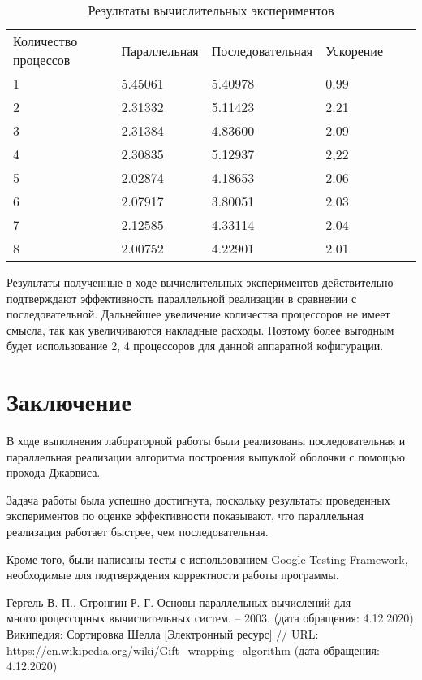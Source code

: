 \documentclass{report}
\begin{document}
\begin{table}[!h]
\caption{Результаты вычислительных экспериментов}
\centering
\begin{tabular}{llllll}
Количество процессов & Параллельная & Последовательная & Ускорение  \\
1        & 5.45061        & 5.40978      & 0.99                     \\
2        & 2.31332        & 5.11423      & 2.21                     \\
3        & 2.31384        & 4.83600      & 2.09                     \\
4        & 2.30835        & 5.12937      & 2,22                     \\
5        & 2.02874        & 4.18653      & 2.06                     \\
6        & 2.07917        & 3.80051      & 2.03                     \\
7        & 2.12585        & 4.33114      & 2.04                     \\
8        & 2.00752        & 4.22901      & 2.01      
\end{tabular}
\end{table}

\par Результаты полученные в ходе вычислительных экспериментов действительно подтверждают эффективность параллельной реализации в сравнении с последовательной. Дальнейшее увеличение количества процессоров не имеет смысла, так как увеличиваются накладные расходы. Поэтому более выгодным будет использование 2, 4 процессоров для данной аппаратной кофигурации.
\newpage

\section*{Заключение}
В ходе выполнения лабораторной работы были реализованы последовательная и параллельная реализации алгоритма построения выпуклой оболочки с помощью прохода Джарвиса.
\par Задача работы была успешно достигнута, поскольку результаты проведенных экспериментов по оценке эффективности показывают, что параллельная реализация работает быстрее, чем последовательная.
\par Кроме того, были написаны тесты с использованием Google Testing Framework, необходимые для подтверждения корректности работы программы.
\newpage

\begin{thebibliography}{1}
 Гергель В. П., Стронгин Р. Г. Основы параллельных вычислений для многопроцессорных вычислительных систем. – 2003. (дата обращения: 4.12.2020)
 Википедия: Сортировка Шелла [Электронный ресурс] // URL: \url {https://en.wikipedia.org/wiki/Gift_wrapping_algorithm} (дата обращения: 4.12.2020)
\end{thebibliography}
\newpage
\end{document}
